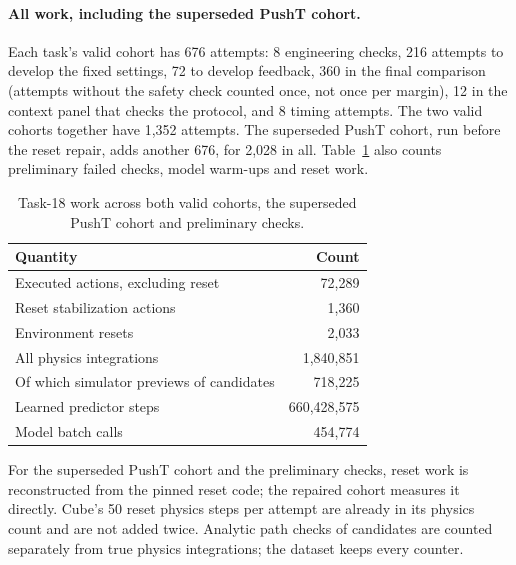 \paragraph{All work, including the superseded PushT cohort.}
Each task's valid cohort has 676 attempts: 8 engineering checks, 216
attempts to develop the fixed settings, 72 to develop feedback, 360 in the
final comparison (attempts without the safety check counted once, not once
per margin), 12 in the context panel that checks the protocol, and 8 timing
attempts. The two
valid cohorts together have 1,352 attempts. The superseded PushT cohort, run
before the reset repair, adds another 676, for 2,028 in all.
Table~\ref{tab:extension-work} also counts preliminary failed checks, model
warm-ups and reset work.
\begin{table}[t]\centering\small
\caption{Task-18 work across both valid cohorts, the superseded PushT cohort and preliminary checks.}
\label{tab:extension-work}
\begin{tabular}{lr}\toprule Quantity & Count \\ \midrule
Executed actions, excluding reset & 72,289 \\
Reset stabilization actions & 1,360 \\
Environment resets & 2,033 \\
All physics integrations & 1,840,851 \\
Of which simulator previews of candidates & 718,225 \\
Learned predictor steps & 660,428,575 \\
Model batch calls & 454,774 \\
\bottomrule\end{tabular}\end{table}
For the superseded PushT cohort and the preliminary checks, reset work is
reconstructed from the pinned reset code; the repaired cohort measures it
directly. Cube's 50 reset physics steps per attempt are already in its
physics count and are not added twice. Analytic path checks of candidates
are counted separately from true physics integrations; the dataset keeps
every counter.

